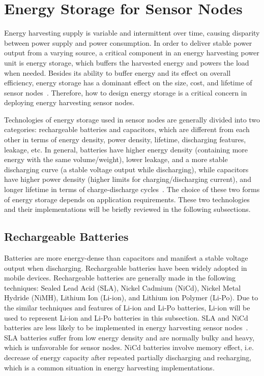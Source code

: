 \section{Energy Storage for Sensor Nodes} \label{Section:ES}

Energy harvesting supply is variable and intermittent over time, causing disparity between power supply and power consumption. In order to deliver stable power output from a varying source, a critical component in an energy harvesting power unit is energy storage, which buffers the harvested energy and powers the load when needed. Besides its ability to buffer energy and its effect on overall efficiency, energy storage has a dominant effect on the size, cost, and lifetime of sensor nodes~\cite{akhtar2015energy}. Therefore, how to design energy storage is a critical concern in deploying energy harvesting sensor nodes. 

Technologies of energy storage used in sensor nodes are generally divided into two categories: rechargeable batteries and capacitors, which are different from each other in terms of energy density, power density, lifetime, discharging features, leakage, etc. In general, batteries have higher energy density (containing more energy with the same volume/weight), lower leakage, and a more stable discharging curve (a stable voltage output while discharging), while capacitors have higher power density (higher limits for charging/discharging current), and longer lifetime in terms of charge-discharge cycles~\cite{raghunathan2005design, akhtar2015energy}. The choice of these two forms of energy storage depends on application requirements. These two technologies and their implementations will be briefly reviewed in the following subsections.

\subsection{Rechargeable Batteries}

Batteries are more energy-dense than capacitors and manifest a stable voltage output when discharging. Rechargeable batteries have been widely adopted in mobile devices. Rechargeable batteries are generally made in the following techniques: Sealed Lead Acid (SLA), Nickel Cadmium (NiCd), Nickel Metal Hydride (NiMH), Lithium Ion (Li-ion), and Lithium ion Polymer (Li-Po). Due to the similar techniques and features of Li-ion and Li-Po batteries, Li-ion will be used to represent Li-ion and Li-Po batteries in this subsection. SLA and NiCd batteries are less likely to be implemented in energy harvesting sensor nodes~\cite{raghunathan2005design, akhtar2015energy}. SLA batteries suffer from low energy density and are normally bulky and heavy, which is unfavorable for sensor nodes. NiCd batteries involve memory effect, i.e. decrease of energy capacity after repeated partially discharging and recharging, which is a common situation in energy harvesting implementations. 


